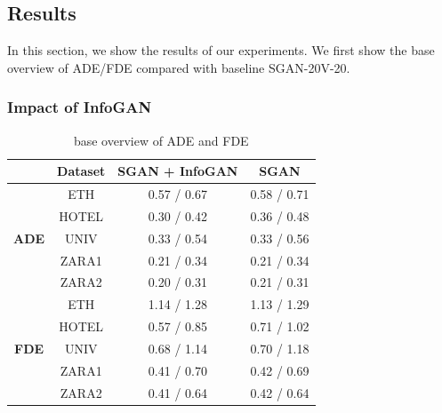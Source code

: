\subsection{Results}

In this section, we show the results of our experiments. We first show the base overview of ADE/FDE compared with baseline SGAN-20V-20.
\subsubsection{Impact of InfoGAN}

\begin{table}[ht]
  \centering
  \caption{base overview of ADE and FDE} 
  \begin{tabular}{cccc}
  \toprule
  & Dataset & SGAN + InfoGAN &  SGAN \\
  \midrule
  \multirow{5}{*}{\bf ADE} & ETH & 0.57 / 0.67 & 0.58 / 0.71 \\
                         & HOTEL & 0.30 / 0.42 & 0.36 / 0.48 \\
                         & UNIV & 0.33 / 0.54 & 0.33 / 0.56 \\
                         & ZARA1 & 0.21 / 0.34 & 0.21 / 0.34 \\
                         & ZARA2 & 0.20 / 0.31  & 0.21 / 0.31 \\
  \hline
  \multirow{5}{*}{\bf FDE} & ETH & 1.14 / 1.28 & 1.13 / 1.29 \\
                        & HOTEL & 0.57 / 0.85 & 0.71 / 1.02 \\
                        & UNIV & 0.68 / 1.14 & 0.70 / 1.18 \\
                        & ZARA1 & 0.41 / 0.70 & 0.42 / 0.69 \\
                        & ZARA2 & 0.41 / 0.64  & 0.42 / 0.64 \\

  \bottomrule
  \end{tabular}
  \label{table:adefde}
\end{table}
\hfill \\
